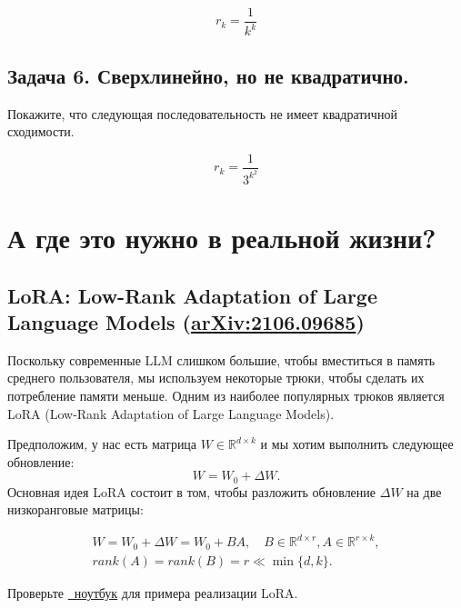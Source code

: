 \documentclass[
  russian,
  letterpaper,
  DIV=11,
  numbers=noendperiod]{scrartcl}
\begin{document}
\[
r_{k} = \frac{1}{k^k}
\]

\subsection{Задача 6. Сверхлинейно, но не
квадратично.}\label{ux437ux430ux434ux430ux447ux430-6.-ux441ux432ux435ux440ux445ux43bux438ux43dux435ux439ux43dux43e-ux43dux43e-ux43dux435-ux43aux432ux430ux434ux440ux430ux442ux438ux447ux43dux43e.}

Покажите, что следующая последовательность не имеет квадратичной
сходимости.

\[
r_{k} = \frac{1}{3^{k^2}}
\]

\section{А где это нужно в реальной
жизни?}\label{ux430-ux433ux434ux435-ux44dux442ux43e-ux43dux443ux436ux43dux43e-ux432-ux440ux435ux430ux43bux44cux43dux43eux439-ux436ux438ux437ux43dux438}

\subsection{\texorpdfstring{LoRA: Low-Rank Adaptation of Large Language
Models
(\href{https://arxiv.org/pdf/2106.09685}{arXiv:2106.09685})}{LoRA: Low-Rank Adaptation of Large Language Models (arXiv:2106.09685)}}\label{lora-low-rank-adaptation-of-large-language-models-arxiv2106.09685}

Поскольку современные LLM слишком большие, чтобы вместиться в память
среднего пользователя, мы используем некоторые трюки, чтобы сделать их
потребление памяти меньше. Одним из наиболее популярных трюков является
LoRA (Low-Rank Adaptation of Large Language Models).

Предположим, у нас есть матрица \(W \in \mathbb{R}^{d \times k}\) и мы
хотим выполнить следующее обновление: \[
W = W_0 + \Delta W.
\] Основная идея LoRA состоит в том, чтобы разложить обновление
\(\Delta W\) на две низкоранговые матрицы:

\begin{gather*}
W = W_0 + \Delta W = W_0 + BA, \quad B \in \mathbb{R}^{d \times r}, A \in \mathbb{R}^{r \times k}, \\
rank(A) = rank(B) = r \ll \min\{d, k\}.
\end{gather*}

Проверьте
\href{https://colab.research.google.com/github/MerkulovDaniil/hse25/blob/main/notebooks/s1_lora_trump.ipynb}{\faPython~ноутбук}
для примера реализации LoRA.
\end{document}
